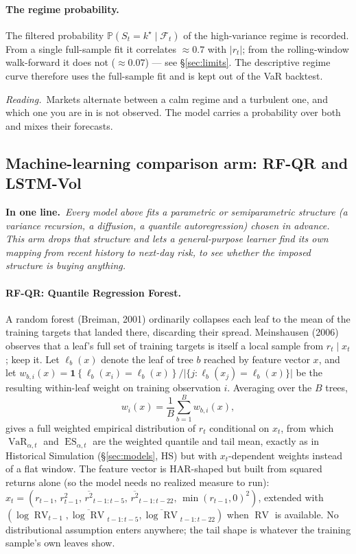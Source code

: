 \documentclass[11pt,a4paper]{article}
\newcommand{\Prob}{\mathbb{P}}
\newcommand{\Ind}[1]{\mathbf{1}\!\left\{#1\right\}}
\newcommand{\VaR}{\operatorname{VaR}}
\newcommand{\ES}{\operatorname{ES}}
\newcommand{\RV}{\operatorname{RV}}
\newcommand{\Fcal}{\mathcal{F}}
\newcommand{\intuition}[1]{\par\smallskip\noindent\textit{Reading.}\ #1\par\smallskip}
\newcommand{\inbrief}[1]{\par\noindent\textbf{In one line.}\ \textit{#1}\par\smallskip}
\begin{document}
\paragraph{The regime probability.} The filtered probability
$\Prob(S_t=k^\star\mid\Fcal_t)$ of the high-variance regime is recorded. From a
single full-sample fit it correlates $\approx0.7$ with $|r_t|$; from the
rolling-window walk-forward it does not ($\approx 0.07$) --- see
\S\ref{sec:limits}. The descriptive regime curve therefore uses the full-sample
fit and is kept out of the VaR backtest.

\intuition{Markets alternate between a calm regime and a turbulent one, and
which one you are in is not observed. The model carries a probability over both
and mixes their forecasts.}

\subsection{Machine-learning comparison arm: RF-QR and LSTM-Vol}\label{sec:ml}

\inbrief{Every model above fits a parametric or semiparametric structure
(a variance recursion, a diffusion, a quantile autoregression) chosen in
advance. This arm drops that structure and lets a general-purpose learner
find its own mapping from recent history to next-day risk, to see whether
the imposed structure is buying anything.}

\paragraph{RF-QR: Quantile Regression Forest.} A random forest
(Breiman, 2001) ordinarily collapses each leaf to the mean of the training
targets that landed there, discarding their spread. Meinshausen (2006)
observes that a leaf's full set of training targets is itself a local
sample from $r_t\mid x_t$; keep it. Let $\ell_b(x)$ denote the leaf of tree
$b$ reached by feature vector $x$, and let
$w_{b,i}(x)=\Ind{\ell_b(x_i)=\ell_b(x)}/\big|\{j:\ell_b(x_j)=\ell_b(x)\}\big|$
be the resulting within-leaf weight on training observation $i$. Averaging
over the $B$ trees,
\begin{equation}
  w_i(x) = \frac{1}{B}\sum_{b=1}^{B} w_{b,i}(x),
\end{equation}
gives a full weighted empirical distribution of $r_t$ conditional on $x_t$,
from which $\VaR_{\alpha,t}$ and $\ES_{\alpha,t}$ are the weighted quantile
and tail mean, exactly as in Historical Simulation
(\S\ref{sec:models}, HS) but with $x_t$-dependent weights instead of a flat
window. The feature vector is HAR-shaped but built from squared returns
alone (so the model needs no realized measure to run):
$x_t=(r_{t-1},\,r_{t-1}^2,\,\overline{r^2}_{t-1:t-5},\,\overline{r^2}_{t-1:t-22},\,
\min(r_{t-1},0)^2)$, extended with $(\log\RV_{t-1},\overline{\log\RV}_{t-1:t-5},
\overline{\log\RV}_{t-1:t-22})$ when $\RV$ is available. No distributional
assumption enters anywhere; the tail shape is whatever the training sample's
own leaves show.
\end{document}
